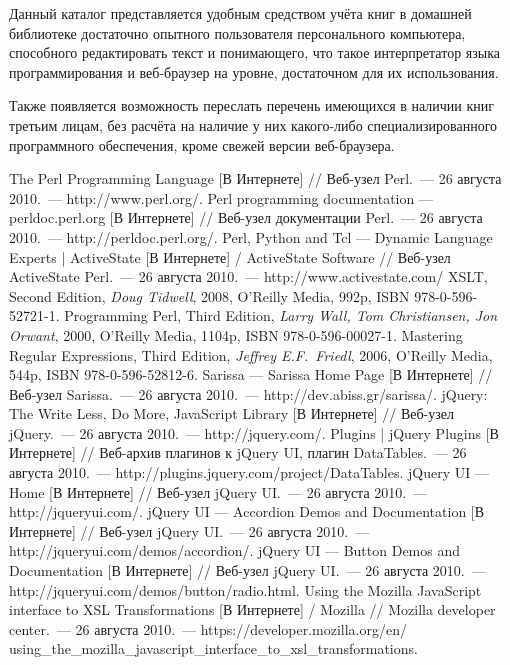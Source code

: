 \documentclass[a4paper,14pt,oneside]{extreport}
\begin{document}
Данный каталог представляется удобным средством учёта книг в домашней библиотеке достаточно опытного пользователя персонального компьютера, способного редактировать текст и понимающего, что такое интерпретатор языка программирования и веб-браузер на уровне, достаточном для их использования.

Также появляется возможность переслать перечень имеющихся в наличии книг третьим лицам, без расчёта на наличие у них какого-либо специализированного программного обеспечения, кроме свежей версии веб-браузера.

\begin{thebibliography}{99}
 The Perl Programming Language [В Интернете] // Веб-узел Perl.~--- 26 августа 2010.~--- http://www.perl.org/.
 Perl programming documentation --- perldoc.perl.org [В Интернете] // Веб-узел документации Perl.~--- 26 августа 2010.~--- http://perldoc.perl.org/.
 Perl, Python and Tcl --- Dynamic Language Experts | ActiveState [В Интернете]  / ActiveState Software // Веб-узел ActiveState Perl.~--- 26 августа 2010.~--- http://www.activestate.com/
 XSLT, Second Edition, {\itshape Doug Tidwell}, 2008, O'Reilly Media, 992p, ISBN 978-0-596-52721-1.
 Programming Perl, Third Edition, {\itshape Larry Wall, Tom Christiansen, Jon Orwant}, 2000, O'Reilly Media, 1104p, ISBN 978-0-596-00027-1.
 Mastering Regular Expressions, Third Edition, {\itshape Jeffrey E.F.~Friedl}, 2006, O'Reilly Media, 544p, ISBN 978-0-596-52812-6.
 Sarissa --- Sarissa Home Page [В Интернете] // Веб-узел Sarissa.~--- 26 августа 2010.~--- http://dev.abiss.gr/sarissa/.
 jQuery: The Write Less, Do More, JavaScript Library [В Интернете] // Веб-узел jQuery.~--- 26 августа 2010.~--- http://jquery.com/.
 Plugins | jQuery Plugins [В Интернете] // Веб-архив плагинов к jQuery UI, плагин DataTables.~--- 26 августа 2010.~--- http://plugins.jquery.com/project/DataTables.
 jQuery UI --- Home [В Интернете] // Веб-узел jQuery UI.~--- 26 августа 2010.~--- http://jqueryui.com/.
 jQuery UI --- Accordion Demos and Documentation [В Интернете] // Веб-узел jQuery UI.~--- 26 августа 2010.~--- http://jqueryui.com/demos/accordion/.
 jQuery UI --- Button Demos and Documentation [В Интернете] // Веб-узел jQuery UI.~--- 26 августа 2010.~--- http://jqueryui.com/demos/button/radio.html.
 Using the Mozilla JavaScript interface to XSL Transformations [В Интернете] / Mozilla // Mozilla developer center.~--- 26 августа 2010.~--- https://developer.mozilla.org/en/\\using\_the\_mozilla\_javascript\_interface\_to\_xsl\_transformations.

\end{thebibliography}
\end{document}
